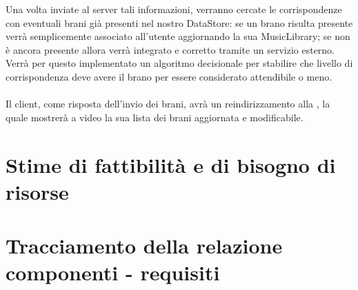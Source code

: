 Una volta inviate al server tali informazioni, verranno cercate le
corrispondenze con eventuali brani gi\`a presenti nel nostro DataStore: se un
brano risulta presente verr\`a semplicemente associato all'utente aggiornando la
sua MusicLibrary; se non \`e ancora presente allora verr\`a integrato e corretto
tramite un servizio esterno. Verr\`a per questo implementato un algoritmo
decisionale per stabilire che livello di corrispondenza deve avere il brano per
essere considerato attendibile o meno.\\
\\
Il client, come risposta dell'invio dei brani, avr\`a un reindirizzamento alla
, la quale mostrer\`a a video la sua lista dei brani
aggiornata e modificabile.

\chapter{Stime di fattibilit\`a e di bisogno di risorse}



\chapter{Tracciamento della relazione componenti - requisiti}

